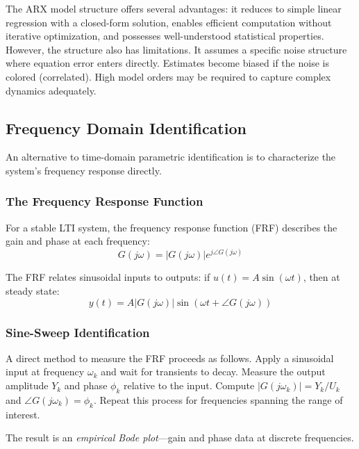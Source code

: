 The ARX model structure offers several advantages: it reduces to simple linear regression with a closed-form solution, enables efficient computation without iterative optimization, and possesses well-understood statistical properties. However, the structure also has limitations. It assumes a specific noise structure where equation error enters directly. Estimates become biased if the noise is colored (correlated). High model orders may be required to capture complex dynamics adequately.

\subsection{Frequency Domain Identification}
\label{subsec:freq_domain}

An alternative to time-domain parametric identification is to characterize the system's frequency response directly.

\subsubsection{The Frequency Response Function}

For a stable LTI system, the frequency response function (FRF) describes the gain and phase at each frequency:
\begin{equation}
G(j\omega) = |G(j\omega)| e^{j\angle G(j\omega)}
\label{eq:frf}
\end{equation}

The FRF relates sinusoidal inputs to outputs: if $u(t) = A\sin(\omega t)$, then at steady state:
\begin{equation}
y(t) = A|G(j\omega)|\sin(\omega t + \angle G(j\omega))
\label{eq:sinusoidal_ss}
\end{equation}

\subsubsection{Sine-Sweep Identification}

A direct method to measure the FRF proceeds as follows. Apply a sinusoidal input at frequency $\omega_k$ and wait for transients to decay. Measure the output amplitude $Y_k$ and phase $\phi_k$ relative to the input. Compute $|G(j\omega_k)| = Y_k / U_k$ and $\angle G(j\omega_k) = \phi_k$. Repeat this process for frequencies spanning the range of interest.

The result is an \textit{empirical Bode plot}---gain and phase data at discrete frequencies.

